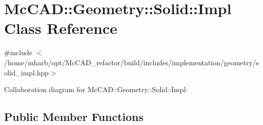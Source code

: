 \hypertarget{classMcCAD_1_1Geometry_1_1Solid_1_1Impl}{}\section{Mc\+C\+AD\+:\+:Geometry\+:\+:Solid\+:\+:Impl Class Reference}
\label{classMcCAD_1_1Geometry_1_1Solid_1_1Impl}


{\ttfamily \#include $<$/home/mharb/opt/\+Mc\+C\+A\+D\+\_\+refactor/build/includes/implementation/geometry/solid\+\_\+impl.\+hpp$>$}



Collaboration diagram for Mc\+C\+AD\+:\+:Geometry\+:\+:Solid\+:\+:Impl\+:
\subsection*{Public Member Functions}
